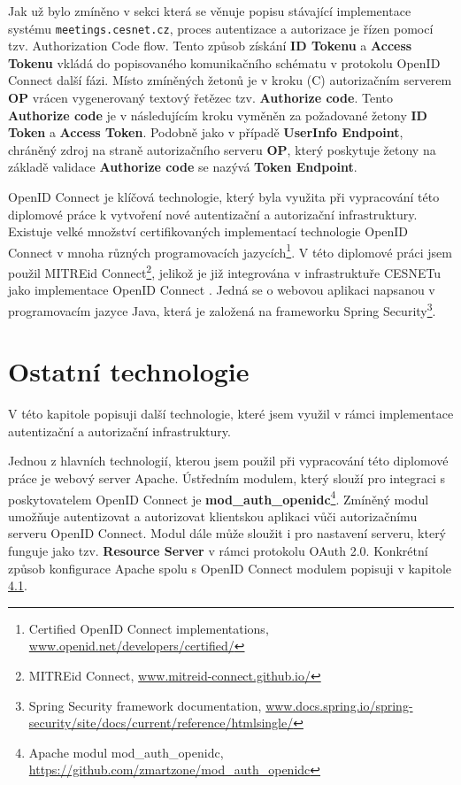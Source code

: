 \documentclass[
  printed, %
  twoside, %
  table,   %
  nolof,     %
  nolot,     %
]{fithesis3}
\begin{document}
Jak už bylo zmíněno v sekci která se věnuje popisu stávající implementace systému \texttt{meetings.cesnet.cz}, proces autentizace a autorizace je řízen pomocí tzv. Authorization Code flow. Tento způsob získání \textbf{ID Tokenu} a \textbf{Access Tokenu} vkládá do popisovaného komunikačního schématu v protokolu OpenID Connect další fázi. Místo zmíněných žetonů je v kroku (C) autorizačním serverem \textbf{OP} vrácen vygenerovaný textový řetězec tzv. \textbf{Authorize code}. Tento \textbf{Authorize code} je v následujícím kroku vyměněn za požadované žetony \textbf{ID Token} a \textbf{Access Token}. Podobně jako v případě \textbf{UserInfo Endpoint}, chráněný zdroj na straně autorizačního serveru \textbf{OP}, který poskytuje žetony na základě validace \textbf{Authorize code} se nazývá \textbf{Token Endpoint}.

\par
OpenID Connect je klíčová technologie, který byla využita při vypracování této diplomové práce k vytvoření nové autentizační a autorizační infrastruktury. Existuje velké množství certifikovaných implementací technologie OpenID Connect v mnoha různých programovacích jazycích\footnote{Certified OpenID Connect implementations, \url{www.openid.net/developers/certified/}}. V této diplomové práci jsem použil MITREid Connect\footnote{MITREid Connect, \url{www.mitreid-connect.github.io/}}, jelikož je již integrována v infrastruktuře CESNETu jako implementace OpenID Connect \cite{oidcPresentation}. Jedná se o webovou aplikaci napsanou v programovacím jazyce Java, která je založená na frameworku Spring Security\footnote{Spring Security framework documentation, \url{www.docs.spring.io/spring-security/site/docs/current/reference/htmlsingle/}}. 

\section{Ostatní technologie}
V této kapitole popisuji další technologie, které jsem využil v rámci implementace autentizační a autorizační infrastruktury. 
\par
Jednou z hlavních technologií, kterou jsem použil při vypracování této diplomové práce je webový server Apache. Ústředním modulem, který slouží pro integraci s poskytovatelem OpenID Connect je \textbf{mod\_auth\_openidc}\footnote{Apache modul mod\_auth\_openidc, \url{https://github.com/zmartzone/mod\_auth\_openidc}}. Zmíněný modul umožňuje autentizovat a autorizovat klientskou aplikaci vůči autorizačnímu serveru OpenID Connect. Modul dále může sloužit i pro nastavení serveru, který funguje jako tzv. \textbf{Resource Server} v rámci protokolu OAuth 2.0. Konkrétní způsob konfigurace Apache spolu s OpenID Connect modulem popisuji v kapitole \hyperref[apacheConfig]{4.1}.
\end{document}
